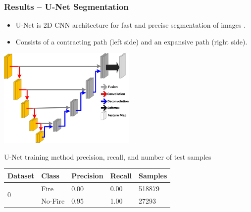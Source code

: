 \documentclass{beamer}
\begin{document}
\begin{frame}
  \frametitle{Results -- U-Net Segmentation}
 \scriptsize
 \begin{itemize}
 \item U-Net is 2D CNN architecture for fast and precise segmentation of images 
\cite{RonnebergerFB15}.
 \item  Consists of a contracting path (left side) and an expansive path (right 
side).
 \end{itemize}

\centering
\includegraphics[width=0.5\textwidth]{figs/U-net-architecture.png}


\begin{table}
\centering

   \scriptsize U-Net training method precision, recall, and number of 
test samples
   \\
    \label{tbl:dnn_results}
\begin{tabular}{ |l|l|l|l|l| }
 \hline
Dataset & Class & Precision & Recall & Samples\\ \hline
\multirow{2}{*}{0} 
 & Fire & 0.00 & 0.00  & 518879 \\
 & No-Fire & 0.95 & 1.00 & 27293 \\ 
 \hline

\end{tabular}
\end{table}

\end{frame}  
\end{document}
